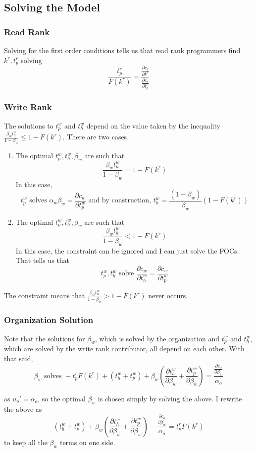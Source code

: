 \documentclass[12pt,notitlepage]{article}
\begin{document}
\subsection{Solving the Model}
\subsubsection{Read Rank}
Solving for the first order conditions tells us that read rank programmers find $k^r, t_p^r$ solving $$\frac{t_p^r}{F(k^r)} = \frac{\frac{\partial c_r}{\partial k^r}}{\frac{\partial c_r}{\partial t_p^r}}$$
\subsubsection{Write Rank}
The solutions to $t_p^w$ and $t_h^w$ depend on the value taken by the inequality $\frac{\beta_w t_h^w}{1-\beta_w} \leq 1-F(k^r)$. There are two cases.
\begin{enumerate}
    \item The optimal $t_p^w, t_h^w, \beta_w$ are such that
    $$\frac{\beta_w t_h^w}{1-\beta_w} = 1-F(k^r)$$
    In this case, 
    $$t_p^w \text{ solves } \alpha_w \beta_w = \frac{\partial c_w}{\partial t_p^w} \text{ and by construction, } t_h^w = \frac{(1-\beta_w)}{\beta_w} (1 -F(k^r))$$
    \item The optimal $t_p^w, t_h^w, \beta_w$ are such that
    $$\frac{\beta_w t_h^w}{1-\beta_w} < 1-F(k^r)$$
    In this case, the constraint can be ignored and I can just solve the FOCs. That tells us that 
    $$t_p^w, t_h^w \text{ solve } \frac{\partial c_w}{\partial t_h^w} = \frac{\partial c_w}{\partial t_p^w}$$
\end{enumerate}

The constraint means that $\frac{\beta_w t_h^w}{1-\beta_w} > 1-F(k^r)$ never occurs. 
\subsubsection{Organization Solution}
Note that the solutions for $\beta_w$, which is solved by the organization and $t_p^w$ and $t_h^w$, which are solved by the write rank contributor, all depend on each other. With that said, 
$$\beta_w \text{ solves } -t_p^rF(k^r) + (t_h^w + t_p^w) + \beta_w\left(\frac{\partial t_h^w}{\partial \beta_w} + \frac{\partial t_p^w}{\partial \beta_w}\right) = \frac{\frac{\partial c_o}{\partial \beta_w}}{\alpha_o}$$

as $u_o' = \alpha_o$, so the optimal $\beta_w$ is chosen simply by solving the above. I rewrite the above as 
$$ (t_h^w + t_p^w) + \beta_w\left(\frac{\partial t_h^w}{\partial \beta_w} + \frac{\partial t_p^w}{\partial \beta_w}\right) - \frac{\frac{\partial c_o}{\partial \beta_w}}{\alpha_o} = t_p^rF(k^r)$$
to keep all the $\beta_w$ terms on one side. 
\end{document}
